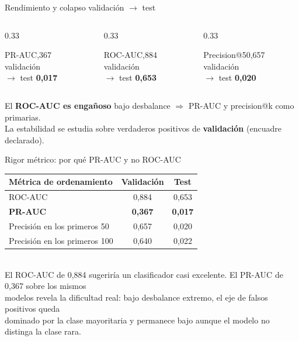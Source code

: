 \documentclass[aspectratio=169,11pt]{beamer}
\begin{document}
\begin{frame}{Rendimiento y colapso validación $\rightarrow$ test}
\begin{columns}[T]
\begin{column}{0.33\textwidth}
\begin{block}{PR-AUC},367 \\ {\footnotesize\color{muted}validación}\\ $\rightarrow$ test \textbf{\color{coral}0,017}\end{block}
\end{column}
\begin{column}{0.33\textwidth}
\begin{block}{ROC-AUC},884 \\ {\footnotesize\color{muted}validación}\\ $\rightarrow$ test \textbf{\color{coral}0,653}\end{block}
\end{column}
\begin{column}{0.33\textwidth}
\begin{block}{Precision@50},657 \\ {\footnotesize\color{muted}validación}\\ $\rightarrow$ test \textbf{\color{coral}0,020}\end{block}
\end{column}
\end{columns}
\vspace{8pt}
\begin{center}\small
El \textbf{ROC-AUC es engañoso} bajo desbalance $\Rightarrow$ PR-AUC y precision@k como primarias.\\
La estabilidad se estudia sobre verdaderos positivos de \textbf{validación} (encuadre declarado).
\end{center}
\end{frame}

\begin{frame}{Rigor métrico: por qué PR-AUC y no ROC-AUC}
\begin{center}
\small
\renewcommand{\arraystretch}{1.35}
\begin{tabular}{lcc}
\toprule
\textbf{Métrica de ordenamiento} & \textbf{Validación} & \textbf{Test} \\
\midrule
ROC-AUC & 0,884 & 0,653 \\
\textbf{PR-AUC} & \textbf{0,367} & \textbf{0,017} \\
Precisión en los primeros 50 & 0,657 & 0,020 \\
Precisión en los primeros 100 & 0,640 & 0,022 \\
\bottomrule
\end{tabular}
\\[9pt]
\footnotesize
El ROC-AUC de 0,884 sugeriría un clasificador casi excelente. El PR-AUC de 0,367 sobre los mismos\\
modelos revela la dificultad real: bajo desbalance extremo, el eje de falsos positivos queda\\
dominado por la clase mayoritaria y permanece bajo aunque el modelo no distinga la clase rara.
\end{center}
\end{frame}
\end{document}
